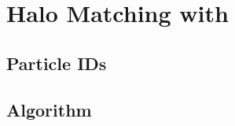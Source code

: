 
\section{Halo Matching with \crossmatch}
\label{sec:crossmatch}



\subsection{Particle IDs}



\subsection{Algorithm}




